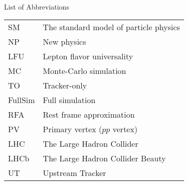 \singlespacing \normalsize
\hbox{\ }

\vspace{.5in}

\begin{center}
\large{List of Abbreviations}
\end{center}

\vspace{3pt}

\begin{supertabular}{ll}
    SM      & The standard model of particle physics \\
    NP      & New physics \\
    LFU     & Lepton flavor universality \\
    MC      & Monte-Carlo simulation \\
    TO      & Tracker-only \\
    FullSim & Full simulation \\
    RFA     & Rest frame approximation \\
    PV      & Primary vertex ($pp$ vertex) \\
    LHC     & The Large Hadron Collider \\
    LHCb    & The Large Hadron Collider Beauty \\
    UT      & Upstream Tracker \\
\end{supertabular}
